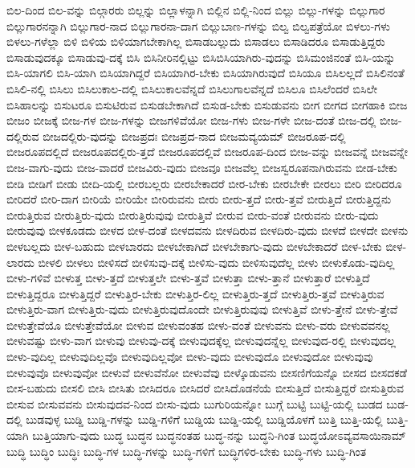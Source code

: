{ಬಿಲ-ದಿಂದ
ಬಿಲ-ವನ್ನು
ಬಿಲ್ಗಾರರು
ಬಿಲ್ಲನ್ನು
ಬಿಲ್ಲಾಳನ್ನಾಗಿ
ಬಿಲ್ಲಿನ
ಬಿಲ್ಲಿ-ನಿಂದ
ಬಿಲ್ಲು
ಬಿಲ್ಲು-ಗಳನ್ನು
ಬಿಲ್ಲುಗಾರ
ಬಿಲ್ಲುಗಾರನನ್ನಾಗಿ
ಬಿಲ್ಲುಗಾರ-ನಾದ
ಬಿಲ್ಲುಗಾರನಾ-ದಾಗ
ಬಿಲ್ಲುಬಾಣ-ಗಳನ್ನು
ಬಿಲ್ವ
ಬಿಲ್ವಪತ್ರೆಯೋ
ಬಿಳಲು-ಗಳು
ಬಿಳಲು-ಗಳೆಲ್ಲಾ
ಬಿಳಿ
ಬಿಳಿಯ
ಬಿಳಿಯಾಗಬೇಕಾಗಿಲ್ಲ
ಬಿಸಾಡಬಲ್ಲುದು
ಬಿಸಾಡಲು
ಬಿಸಾಡಿದರೂ
ಬಿಸಾಡುತ್ತಿದ್ದರು
ಬಿಸಾಡುವುದಕ್ಕೂ
ಬಿಸಾಡುವು-ದಕ್ಕೆ
ಬಿಸಿ
ಬಿಸಿನೀರಿನಲ್ಲಿಟ್ಟು
ಬಿಸಿಬಿಸಿಯಾಗಿರು-ವುದನ್ನು
ಬಿಸಿಮಂಜಿನಂತೆ
ಬಿಸಿ-ಯನ್ನು
ಬಿಸಿ-ಯಾಗಲಿ
ಬಿಸಿ-ಯಾಗಿ
ಬಿಸಿಯಾಗಿದ್ದರೆ
ಬಿಸಿಯಾಗಿರ-ಬೇಕು
ಬಿಸಿಯಾಗಿರುವುದೆ
ಬಿಸಿಯೂ
ಬಿಸಿಲಲ್ಲದೆ
ಬಿಸಿಲಿನಂತೆ
ಬಿಸಿಲಿ-ನಲ್ಲಿ
ಬಿಸಿಲು
ಬಿಸಿಲುಕಾಲ-ದಲ್ಲಿ
ಬಿಸಿಲುಕಾಲವೆನ್ನದೆ
ಬಿಸಿಲುಗಾಲವೆನ್ನದೆ
ಬಿಸಿಲೂ
ಬಿಸಿಲೆಂದರೆ
ಬಿಸಿಲೇ
ಬಿಸಿಹಾಲನ್ನು
ಬಿಸುಟರೂ
ಬಿಸುಟಿರುವ
ಬಿಸುಡಬೇಕಾಗಿದೆ
ಬಿಸುಡ-ಬೇಕು
ಬಿಸುಡುವನು
ಬೀಗ
ಬೀಗದ
ಬೀಗಹಾಕಿ
ಬೀಜ
ಬೀಜಂ
ಬೀಜಕ್ಕೆ
ಬೀಜ-ಗಳ
ಬೀಜ-ಗಳನ್ನು
ಬೀಜಗಳಿವೆಯೋ
ಬೀಜ-ಗಳು
ಬೀಜ-ಗಳೇ
ಬೀಜ-ದಂತೆ
ಬೀಜ-ದಲ್ಲಿ
ಬೀಜ-ದಲ್ಲಿರುವ
ಬೀಜದಲ್ಲಿರು-ವುದನ್ನು
ಬೀಜಪ್ರದಃ
ಬೀಜಪ್ರದ-ನಾದ
ಬೀಜಮವ್ಯಯಮ್
ಬೀಜರೂಪ-ದಲ್ಲಿ
ಬೀಜರೂಪದಲ್ಲಿದೆ
ಬೀಜರೂಪದಲ್ಲಿರು-ತ್ತದೆ
ಬೀಜರೂಪದಲ್ಲಿವೆ
ಬೀಜರೂಪ-ದಿಂದ
ಬೀಜ-ವನ್ನು
ಬೀಜವನ್ನೆ
ಬೀಜವನ್ನೇ
ಬೀಜ-ವಾಗು-ವುದು
ಬೀಜ-ವಾದರೆ
ಬೀಜವಿರು-ವುದು
ಬೀಜವೂ
ಬೀಜವೆಲ್ಲ
ಬೀಜಸ್ವರೂಪನಾಗಿರುವನು
ಬೀಡ-ಬೇಕು
ಬೀಡಿ
ಬೀಡಿಗೆ
ಬೀಡು
ಬೀದಿ-ಯಲ್ಲಿ
ಬೀರಬಲ್ಲರು
ಬೀರಬೇಕಾದರೆ
ಬೀರ-ಬೇಕು
ಬೀರಬೇಕೇ
ಬೀರಲು
ಬೀರಿ
ಬೀರಿದರೂ
ಬೀರಿದರೆ
ಬೀರಿ-ದಾಗ
ಬೀರಿಯೆ
ಬೀರಿಯೇ
ಬೀರಿರುವನು
ಬೀರು
ಬೀರು-ತ್ತದೆ
ಬೀರು-ತ್ತವೆ
ಬೀರುತ್ತಿದೆ
ಬೀರುತ್ತಿದ್ದನು
ಬೀರುತ್ತಿರುವ
ಬೀರುತ್ತಿರು-ವುದು
ಬೀರುತ್ತಿರುವುವು
ಬೀರುತ್ತಿವೆ
ಬೀರುವ
ಬೀರು-ವಂತೆ
ಬೀರುವನು
ಬೀರು-ವುದು
ಬೀರುವುವು
ಬೀಳಕೂಡದು
ಬೀಳದ
ಬೀಳ-ದಂತೆ
ಬೀಳದವನು
ಬೀಳದಿರುವ
ಬೀಳದಿರು-ವುದು
ಬೀಳದೆ
ಬೀಳದೇ
ಬೀಳನು
ಬೀಳಬಲ್ಲದು
ಬೀಳ-ಬಹುದು
ಬೀಳಬಾರದು
ಬೀಳಬೇಕಾಗಿದೆ
ಬೀಳಬೇಕಾಗು-ವುದು
ಬೀಳಬೇಕಾದರೆ
ಬೀಳ-ಬೇಕು
ಬೀಳ-ಲಾರದು
ಬೀಳಲಿ
ಬೀಳಲು
ಬೀಳಿಸದೆ
ಬೀಳಿಸುವು-ದಕ್ಕೆ
ಬೀಳಿಸು-ವುದು
ಬೀಳಿಸುವುದೆಲ್ಲ
ಬೀಳು
ಬೀಳುಕೊಡು-ವುದಿಲ್ಲ
ಬೀಳು-ಗಳಿವೆ
ಬೀಳುತ್ತ
ಬೀಳು-ತ್ತದೆ
ಬೀಳುತ್ತಲೇ
ಬೀಳು-ತ್ತವೆ
ಬೀಳುತ್ತಾ
ಬೀಳು-ತ್ತಾನೆ
ಬೀಳುತ್ತಾರೆ
ಬೀಳುತ್ತಿದೆ
ಬೀಳುತ್ತಿದ್ದರೂ
ಬೀಳುತ್ತಿದ್ದರೆ
ಬೀಳುತ್ತಿರ-ಬೇಕು
ಬೀಳುತ್ತಿರ-ಲಿಲ್ಲ
ಬೀಳುತ್ತಿರು-ತ್ತದೆ
ಬೀಳುತ್ತಿರು-ತ್ತವೆ
ಬೀಳುತ್ತಿರುವ
ಬೀಳುತ್ತಿರು-ವಾಗ
ಬೀಳುತ್ತಿರು-ವುದು
ಬೀಳುತ್ತಿರುವುದೊಂದೇ
ಬೀಳುತ್ತಿರುವುವು
ಬೀಳುತ್ತಿವೆ
ಬೀಳು-ತ್ತೇನೆ
ಬೀಳು-ತ್ತೇವೆ
ಬೀಳುತ್ತೇವೆಯೊ
ಬೀಳುತ್ತೇವೆಯೋ
ಬೀಳುವ
ಬೀಳುವಂತಹ
ಬೀಳು-ವಂತೆ
ಬೀಳುವನು
ಬೀಳು-ವರು
ಬೀಳುವವನಲ್ಲ
ಬೀಳುವಷ್ಟು
ಬೀಳು-ವಾಗ
ಬೀಳುವು
ಬೀಳುವು-ದಕ್ಕೆ
ಬೀಳುವುದಕ್ಕೆಲ್ಲ
ಬೀಳುವುದನ್ನೆಲ್ಲ
ಬೀಳುವುದ-ರಲ್ಲಿ
ಬೀಳುವುದಲ್ಲ
ಬೀಳು-ವುದಿಲ್ಲ
ಬೀಳುವುದಿಲ್ಲವೊ
ಬೀಳುವುದಿಲ್ಲವೋ
ಬೀಳು-ವುದು
ಬೀಳುವುದೊ
ಬೀಳುವುದೋ
ಬೀಳುವುವು
ಬೀಳುವುವೊ
ಬೀಳುವುವೋ
ಬೀಳುವೆ
ಬೀಳುವೆನೋ
ಬೀಳುವೆವು
ಬೀಳ್ಕೊಡುವನು
ಬೀಸಣಿಗೆಯನ್ನೊ
ಬೀಸದ
ಬೀಸದಕಡೆ
ಬೀಸ-ಬಹುದು
ಬೀಸಲಿ
ಬೀಸಿ
ಬೀಸಿತು
ಬೀಸಿದರೂ
ಬೀಸಿದರೆ
ಬೀಸಿದೊಡನೆಯೆ
ಬೀಸುತ್ತಿದೆ
ಬೀಸುತ್ತಿದ್ದರೆ
ಬೀಸುತ್ತಿರುವ
ಬೀಸುವ
ಬೀಸುವವನು
ಬೀಸುವುದವ-ನಿಂದ
ಬೀಸು-ವುದು
ಬುಗುರಿಯನ್ನೋ
ಬುಗ್ಗೆ
ಬುಟ್ಟಿ
ಬುಟ್ಟಿ-ಯಲ್ಲಿ
ಬುಡದ
ಬುಡ-ದಲ್ಲಿ
ಬುಡವುಳ್ಳ
ಬುಡ್ಡಿ
ಬುಡ್ಡಿ-ಗಳನ್ನು
ಬುಡ್ಡಿ-ಗಳಿಗೆ
ಬುಡ್ಡಿಯ
ಬುಡ್ಡಿ-ಯಲ್ಲಿ
ಬುಡ್ಡಿಯೊಳಗೆ
ಬುತ್ತಿ
ಬುತ್ತಿ-ಯಲ್ಲಿ
ಬುತ್ತಿ-ಯಾಗಿ
ಬುತ್ತಿಯಾಗು-ವುದು
ಬುದ್ಧ
ಬುದ್ಧನ
ಬುದ್ಧನಂತಹ
ಬುದ್ಧ-ನನ್ನು
ಬುದ್ಧನಿ-ಗಿಂತ
ಬುದ್ಧಯೋಽವ್ಯವಸಾಯಿನಾಮ್
ಬುದ್ಧಿ
ಬುದ್ಧಿಂ
ಬುದ್ಧಿಃ
ಬುದ್ಧಿ-ಗಳ
ಬುದ್ಧಿ-ಗಳನ್ನು
ಬುದ್ಧಿ-ಗಳಿಗೆ
ಬುದ್ಧಿಗಳಿರ-ಬೇಕು
ಬುದ್ಧಿ-ಗಳು
ಬುದ್ಧಿ-ಗಿಂತ
}
